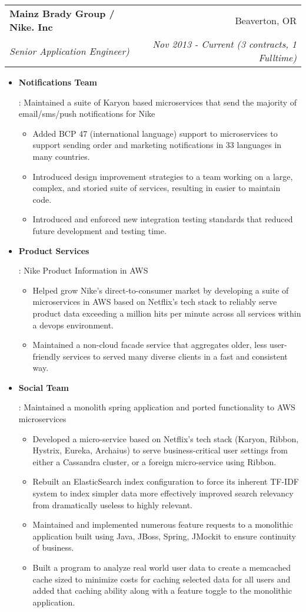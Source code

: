 \documentclass[letterpaper,10pt]{article}
\makeatletter
\newcommand{\resumeItem}[2]{
  \item\small{
    \textbf{#1}{: #2 \vspace{-2pt}}
  }
}
\newcommand{\resumeSubheading}[4]{
  \vspace{-1pt}\item[]
  \begin{tabular*}{0.98\textwidth}{l@{\extracolsep{\fill}}r}
      \hspace{-10pt}\textbf{#1} & #2 \\
      \hspace{-10pt}\textit{\small#3} & \textit{\small #4} \\
    \end{tabular*}\vspace{-5pt}
}
\newcommand{\resumeItemListStart}{\begin{itemize}}
\newcommand{\resumeItemListEnd}{\end{itemize}\vspace{-5pt}}
\makeatother
\begin{document}
    \resumeSubheading
      {Mainz Brady Group / Nike. Inc}{Beaverton, OR}
      {Senior Application Engineer)}{Nov 2013 - Current (3 contracts, 1 Fulltime)}
      \resumeItemListStart
        \resumeItem{Notifications Team}
          {Maintained a suite of Karyon based microservices that send the majority of email/sms/push notifications for Nike
            \begin{itemize}
                \item Added BCP 47 (international language) support to microservices to support sending order and marketing notifications in 33 languages in many countries.
                \item Introduced design improvement strategies to a team working on a large, complex, and storied suite of services, resulting in easier to maintain code.
                \item Introduced and enforced new integration testing standards that reduced future development and testing time.
            \end{itemize}
            }
        \resumeItem{Product Services}
          {Nike Product Information in AWS
            \begin{itemize}
                \item Helped grow Nike's direct-to-consumer market by developing a suite of microservices in AWS based on Netflix's tech stack to reliably serve product data exceeding a million hits per minute across all services within a devops environment.
                \item Maintained a non-cloud facade service that aggregates older, less user-friendly services to served many diverse clients in a fast and consistent way.
            \end{itemize}
          }
        \resumeItem{Social Team}
          {Maintained a monolith spring application and ported functionality to AWS microservices
          \begin{itemize}
              \item Developed a micro-service based on Netflix's tech stack (Karyon, Ribbon, Hystrix, Eureka, Archaius) to serve business-critical user settings from either a Cassandra cluster, or a foreign micro-service using Ribbon.
              \item Rebuilt an ElasticSearch index configuration to force its inherent TF-IDF system to index simpler data more effectively improved search relevancy from dramatically useless to highly relevant.
              \item Maintained and implemented numerous feature requests to a monolithic application built using Java, JBoss, Spring, JMockit to ensure continuity of business.
              \item Built a program to analyze real world user data to create a memcached cache sized to minimize costs for caching selected data for all users and added that caching ability along with a feature toggle to the monolithic application.
          \end{itemize}
          }
      \resumeItemListEnd
\end{document}
